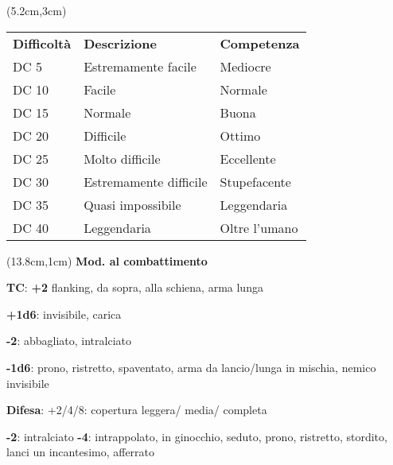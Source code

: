 \documentclass[a4paper,12 pt,openany]{book}
\begin{document}
\begin{textblock*}{8.5cm}(5.2cm,3cm) %
	\footnotesize
	\begin{tabular}{lll}
\textbf{Difficoltà} & \textbf{Descrizione} & \textbf{Competenza} \\
DC 5           & Estremamente facile              & Mediocre                        \\
DC 10          & Facile                           & Normale                         \\
DC 15          & Normale                          & Buona                           \\
DC 20          & Difficile                        & Ottimo                          \\
DC 25          & Molto difficile                  & Eccellente                      \\
DC 30          & Estremamente difficile           & Stupefacente                    \\
DC 35          & Quasi impossibile                & Leggendaria                     \\
DC 40          & Leggendaria                      & Oltre l'umano                   \\
		\end{tabular}
	\end{textblock*}



\begin{textblock*}{6.2cm}(13.8cm,1cm) %
\textbf{Mod. al combattimento}

{\footnotesize \textbf{TC}: \textbf{+2} flanking, da sopra, alla schiena, arma lunga

\textbf{+1d6}: invisibile, carica

\textbf{-2}: abbagliato, intralciato

\textbf{-1d6}: prono, ristretto, spaventato, arma da lancio/lunga in mischia, nemico invisibile

\textbf{Difesa}: +2/4/8: copertura leggera/ media/ completa

\textbf{-2}: intralciato \textbf{-4}: intrappolato, in ginocchio, seduto, prono, ristretto, stordito, lanci un incantesimo, afferrato}
\end{textblock*}
\end{document}

